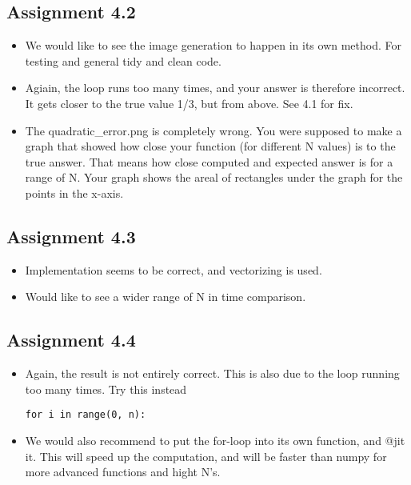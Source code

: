 \documentclass[a4paper]{article}
\begin{document}
\subsection*{Assignment 4.2} \label{sec:assignment5.2}
\begin{itemize}
  \item We would like to see the image generation to happen in its own method. For testing and general tidy and clean code.
  \item Agiain, the loop runs too many times, and your answer is therefore incorrect. It gets closer to the true value {1/3}, but from above. See 4.1 for fix.
  
 \item  The quadratic{\_}error.png is completely wrong. You were supposed to make a graph that showed how close your function (for different N values) is to the true answer. That means how close computed and expected answer is for a range of N. Your graph shows the areal of rectangles under the graph for the points in the x-axis. 
\end{itemize}


\subsection*{Assignment 4.3}

\begin{itemize}
  \item Implementation seems to be correct, and vectorizing is used. 
   \item Would like to see a wider range of N in time comparison. 
\end{itemize}

\subsection*{Assignment 4.4}
\begin{itemize}
  \item Again, the result is not entirely correct. This is also due to the loop running too many times. Try this instead
  \begin{verbatim}
for i in range(0, n): 
\end{verbatim}
   \item We would also recommend to put the for-loop into its own function, and @jit it. This will speed up the computation, and will be faster than numpy for more advanced functions and hight N's. 
\end{itemize}
\end{document}
